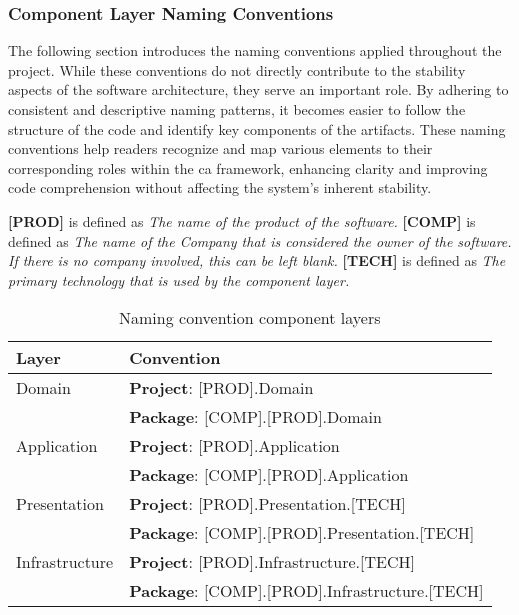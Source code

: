 \subsubsection{Component Layer Naming Conventions} \label{appendix_component_naming_convention}

The following section introduces the naming conventions applied throughout the project.
While these conventions do not directly contribute to the stability aspects of the
software architecture, they serve an important role. By adhering to consistent and
descriptive naming patterns, it becomes easier to follow the structure of the code and
identify key components of the artifacts. These naming conventions help readers recognize
and map various elements to their corresponding roles within the \gls{ca} framework,
enhancing clarity and improving code comprehension without affecting the system's inherent
stability.

\textbf{[PROD]} is defined as \textit{The name of the product of the software.} \newline 
\textbf{[COMP]} is defined as \textit{The name of the Company that is considered the owner of the software. If
there is no company involved, this can be left blank.} \newline 
\textbf{[TECH]} is defined as \textit{The primary technology that is used by the component layer.} 

\begin{table}[H]
  \renewcommand{\arraystretch}{1.5}
    \footnotesize
    \caption{Naming convention component layers}
    \begin{tabular}{ l l }
    \hline
    \textbf{Layer} & \textbf{Convention} \\ 
    \hline
    Domain & \textbf{Project}: [PROD].Domain \\ & \textbf{Package}: [COMP].[PROD].Domain \\
    Application & \textbf{Project}: [PROD].Application \\ & \textbf{Package}: [COMP].[PROD].Application \\
    Presentation & \textbf{Project}: [PROD].Presentation.[TECH] \\ & \textbf{Package}: [COMP].[PROD].Presentation.[TECH] \\
    Infrastructure & \textbf{Project}: [PROD].Infrastructure.[TECH] \\ & \textbf{Package}: [COMP].[PROD].Infrastructure.[TECH]
    \\ \hline
    \end{tabular}

\label{table:component_naming_convention}
\end{table}

